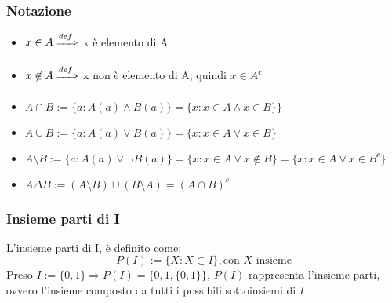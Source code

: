\documentclass[a4paper,12pt]{article}
\begin{document}
	\subsubsection{Notazione}
	\begin{itemize}
		\item $x\in A \xRightarrow{def}$ x è elemento di A 
		\item $x\not \in A \xRightarrow{def}$ x non è elemento di A, quindi $x\in A^c$
		\item $A \cap B := \{a : A(a) \wedge B(a)\} = \{x : x \in A \wedge x \in B\} \}$
		\item $A \cup B := \{a : A(a) \vee B(a)\} = \{x : x \in A \vee x \in B\}$
		\item $A \setminus B := \{a : A(a) \vee \neg B(a)\} = \{x : x\in A \vee x \not \in B\} = \{x : x\in A \vee x \in B^c\}$
		\item $A \Delta B := (A \setminus B ) \cup (B \setminus A) = (A \cap B)^c$
	\end{itemize}
	
	\subsubsection{Insieme parti di I}
	L'insieme parti di I, è definito come:
	\[
	P(I) := \{X : X \subset I\}, \text{con $X$ insieme}
	\]
	Preso $I := \{0, 1\} \Rightarrow P(I) = \{0, 1, \{0, 1\}\}$, $P(I)$ rappresenta l'insieme parti, ovvero l'insieme composto da tutti i possibili sottoinsiemi di $I$
	
\end{document}
